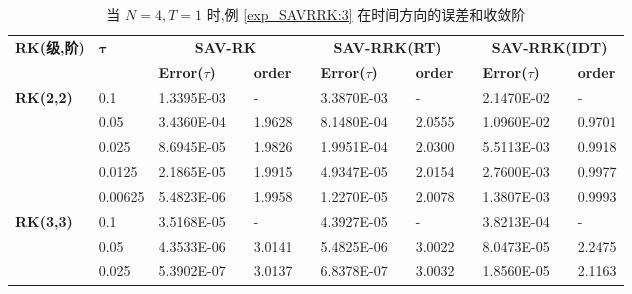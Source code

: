 \documentclass[aspectratio=169]{beamer}
\numberwithin{theorem}{section} %
\begin{document}
\begin{frame}%
	\begin{table}[H]\scriptsize
		\centering
		\caption{当 $N=4, T = 1$ 时,例 \ref{exp_SAVRRK:3} 在时间方向的误差和收敛阶}
		\begin{tabular}{lllllrlrlrlrlrl}
		\toprule
		\multicolumn{2}{l}{\multirow{2}[3]{*}{\textbf{RK(级,阶)}}} & \multicolumn{2}{l}{\multirow{2}[3]{*}{$\bm{\tau}$}} & \multicolumn{3}{c}{\textbf{SAV-RK}} &       & \multicolumn{3}{c}{\textbf{SAV-RRK(RT)}} &       & \multicolumn{3}{c}{\textbf{SAV-RRK(IDT)}} \\
		\cmidrule{5-7}\cmidrule{9-11}\cmidrule{13-15}    \multicolumn{2}{l}{} & \multicolumn{2}{l}{} & \textbf{Error($\tau$)} &       & \textbf{order} &       & \textbf{Error($\tau$)} &       & \textbf{order} &       & \textbf{Error($\tau$)} &       & \textbf{order} \\
		\hline
		\multicolumn{2}{l}{\multirow{5}[0]{*}{\textbf{RK(2,2)}}} & \multicolumn{2}{l}{0.1} & 1.3395E-03 &       & -     &       & 3.3870E-03 &       & -     &       & 2.1470E-02 &       & - \\
		\multicolumn{2}{l}{} & \multicolumn{2}{l}{0.05} & 3.4360E-04 &       & 1.9628  &       & 8.1480E-04 &       & 2.0555  &       & 1.0960E-02 &       & 0.9701  \\
		\multicolumn{2}{l}{} & \multicolumn{2}{l}{0.025} & 8.6945E-05 &       & 1.9826  &       & 1.9951E-04 &       & 2.0300  &       & 5.5113E-03 &       & 0.9918  \\
		\multicolumn{2}{l}{} & \multicolumn{2}{l}{0.0125} & 2.1865E-05 &       & 1.9915  &       & 4.9347E-05 &       & 2.0154  &       & 2.7600E-03 &       & 0.9977  \\
		\multicolumn{2}{l}{} & \multicolumn{2}{l}{0.00625} & 5.4823E-06 &       & 1.9958  &       & 1.2270E-05 &       & 2.0078  &       & 1.3807E-03 &       & 0.9993  \\
		\multicolumn{2}{l}{\multirow{5}[0]{*}{\textbf{RK(3,3)}}} & \multicolumn{2}{l}{0.1} & 3.5168E-05 &       & -     &       & 4.3927E-05 &       & -     &       & 3.8213E-04 &       & - \\
		\multicolumn{2}{l}{} & \multicolumn{2}{l}{0.05} & 4.3533E-06 &       & 3.0141  &       & 5.4825E-06 &       & 3.0022  &       & 8.0473E-05 &       & 2.2475  \\
		\multicolumn{2}{l}{} & \multicolumn{2}{l}{0.025} & 5.3902E-07 &       & 3.0137  &       & 6.8378E-07 &       & 3.0032  &       & 1.8560E-05 &       & 2.1163  \\

\end{tabular}
\end{table}
\end{frame}
\end{document}
